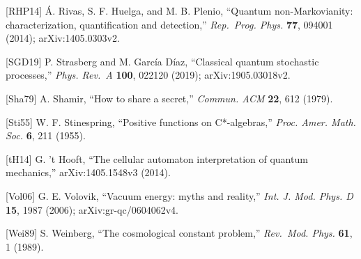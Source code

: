 \documentclass[
]{article}
\begin{document}
{[}RHP14{]} Á. Rivas, S. F. Huelga, and M. B. Plenio, ``Quantum
non-Markovianity: characterization, quantification and detection,''
\emph{Rep.~Prog. Phys.} \textbf{77}, 094001 (2014); arXiv:1405.0303v2.

{[}SGD19{]} P. Strasberg and M. García Díaz, ``Classical quantum
stochastic processes,'' \emph{Phys. Rev.~A} \textbf{100}, 022120 (2019);
arXiv:1905.03018v2.

{[}Sha79{]} A. Shamir, ``How to share a secret,'' \emph{Commun. ACM}
\textbf{22}, 612 (1979).

{[}Sti55{]} W. F. Stinespring, ``Positive functions on C*-algebras,''
\emph{Proc. Amer. Math. Soc.} \textbf{6}, 211 (1955).

{[}tH14{]} G. 't Hooft, ``The cellular automaton interpretation of
quantum mechanics,'' arXiv:1405.1548v3 (2014).

{[}Vol06{]} G. E. Volovik, ``Vacuum energy: myths and reality,''
\emph{Int. J. Mod. Phys. D} \textbf{15}, 1987 (2006);
arXiv:gr-qc/0604062v4.

{[}Wei89{]} S. Weinberg, ``The cosmological constant problem,''
\emph{Rev.~Mod. Phys.} \textbf{61}, 1 (1989).

\endgroup
\end{document}
